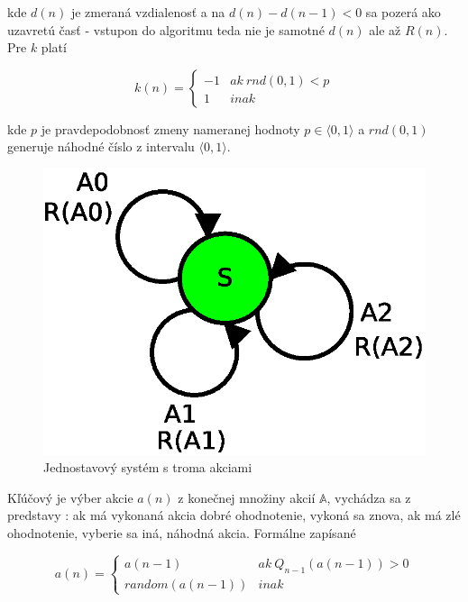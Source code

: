 kde $d(n)$ je zmeraná vzdialenosť a na $d(n) - d(n-1) < 0 $ sa pozerá
ako uzavretú časť - vstupon do algoritmu teda nie je samotné $d(n)$ ale až
$R(n)$. Pre $k$ platí

\begin{equation}
k(n) =
\left\{
	\begin{array}{ll}
		-1  & ak \ rnd(0, 1) < p\\
    1 & inak
	\end{array}
\right.
\label{eq:q_nano_r_func_simple_prob}
\end{equation}

kde $p$ je pravdepodobnosť zmeny nameranej hodnoty $p \in \langle 0, 1 \rangle $ a $rnd(0, 1)$ generuje náhodné
číslo z intervalu $\langle 0, 1 \rangle$.

\begin{figure}[!htb]
\centering
\includegraphics[scale=.6]{../diagrams/single_state.eps}
\caption{Jednostavový systém s troma akciami}
\label{img:single_state_system}
\end{figure}

Kľúčový je výber akcie $a(n)$ z konečnej množiny akcií $\mathbb{A}$,
vychádza sa z predstavy : ak má vykonaná akcia dobré ohodnotenie,
vykoná sa znova, ak má zlé ohodnotenie, vyberie sa iná, náhodná akcia.
Formálne zapísané

\begin{equation}
a(n) =
\left\{
	\begin{array}{ll}
		a(n-1)  & ak \ Q_{n-1}(a(n-1)) > 0 \\
    random(a(n-1)) & inak
	\end{array}
\right.
\label{eq:q_nano_action_selection}
\end{equation}

